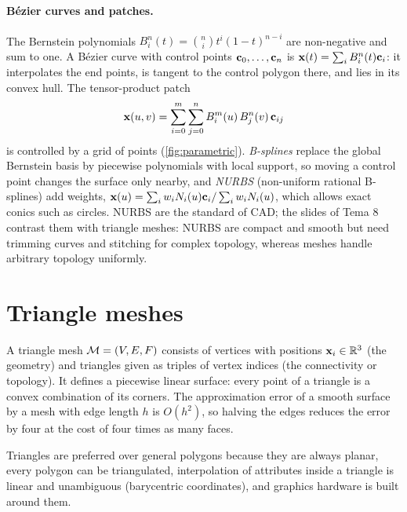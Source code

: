 \paragraph{B\'ezier curves and patches.} The Bernstein polynomials
$B_i^n(t)=\binom{n}{i}t^i(1-t)^{n-i}$ are non-negative and sum to one. A B\'ezier curve with
control points $\mathbf{c}_0,\dots,\mathbf{c}_n$ is $\mathbf{x}(t)=\sum_i B_i^n(t)\mathbf{c}_i$: it interpolates the end
points, is tangent to the control polygon there, and lies in its convex hull. The tensor-product
patch
\begin{equation}
\mathbf{x}(u,v)=\sum_{i=0}^{m}\sum_{j=0}^{n}B_i^m(u)\,B_j^n(v)\,\mathbf{c}_{ij}
\end{equation}
is controlled by a grid of points (\cref{fig:parametric}). \emph{B-splines} replace the global
Bernstein basis by piecewise polynomials with local support, so moving a control point changes the
surface only nearby, and \emph{NURBS} (non-uniform rational B-splines) add weights,
$\mathbf{x}(u)=\sum_i w_iN_i(u)\mathbf{c}_i/\sum_iw_iN_i(u)$, which allows exact conics such as circles. NURBS are
the standard of CAD; the slides of Tema 8 contrast them with triangle meshes: NURBS are compact and
smooth but need trimming curves and stitching for complex topology, whereas meshes handle
arbitrary topology uniformly.


\section{Triangle meshes}

A triangle mesh $\mathcal{M}=(V,E,F)$ consists of vertices with positions $\mathbf{x}_i\in\mathbb{R}^3$ (the geometry) and
triangles given as triples of vertex indices (the connectivity or topology). It defines a
piecewise linear surface: every point of a triangle is a convex combination of its corners. The
approximation error of a smooth surface by a mesh with edge length $h$ is $O(h^2)$, so halving the
edges reduces the error by four at the cost of four times as many faces.

Triangles are preferred over general polygons because they are always planar, every polygon can
be triangulated, interpolation of attributes inside a triangle is linear and unambiguous
(barycentric coordinates), and graphics hardware is built around them.

